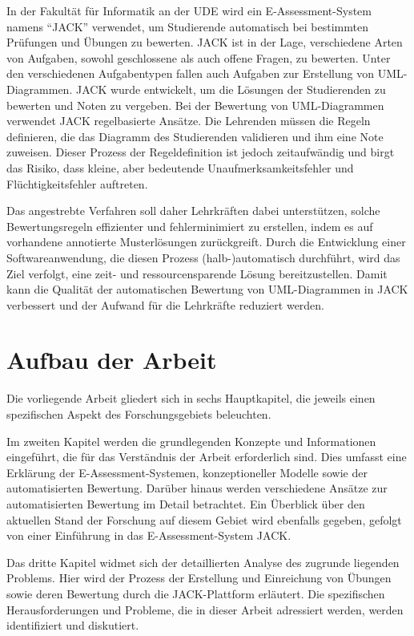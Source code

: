 In der Fakultät für Informatik an der \ac{UDE} wird ein E-Assessment-System namens ``\gls{JACK}'' \cite{jack}  verwendet, um Studierende automatisch bei bestimmten Prüfungen und Übungen zu bewerten. \gls{JACK} ist in der Lage, verschiedene Arten von Aufgaben, sowohl geschlossene als auch offene Fragen, zu bewerten. Unter den verschiedenen Aufgabentypen fallen auch Aufgaben zur Erstellung von \ac{UML}-Diagrammen. \gls{JACK} wurde entwickelt, um die Lösungen der Studierenden zu bewerten und Noten zu vergeben. Bei der Bewertung von \ac{UML}-Diagrammen verwendet \gls{JACK} regelbasierte Ansätze. Die Lehrenden müssen die Regeln definieren, die das Diagramm des Studierenden validieren und ihm eine Note zuweisen. Dieser Prozess der Regeldefinition ist jedoch zeitaufwändig und birgt das Risiko, dass kleine, aber bedeutende Unaufmerksamkeitsfehler und Flüchtigkeitsfehler auftreten.

Das angestrebte Verfahren soll daher Lehrkräften dabei unterstützen, solche Bewertungsregeln effizienter und fehlerminimiert zu erstellen, indem es auf vorhandene annotierte Musterlösungen zurückgreift. Durch die Entwicklung einer Softwareanwendung, die diesen Prozess (halb-)automatisch durchführt, wird das Ziel verfolgt, eine zeit- und ressourcensparende Lösung bereitzustellen. Damit kann die Qualität der automatischen Bewertung von UML-Diagrammen in \gls{JACK} verbessert und der Aufwand für die Lehrkräfte reduziert werden.

\section{Aufbau der Arbeit}

Die vorliegende Arbeit gliedert sich in sechs Hauptkapitel, die jeweils einen spezifischen Aspekt des Forschungsgebiets beleuchten.

Im zweiten Kapitel werden die grundlegenden Konzepte und Informationen eingeführt, die für das Verständnis der Arbeit erforderlich sind. Dies umfasst eine Erklärung der \gls{E-Assessment-Systemen}, konzeptioneller Modelle sowie der automatisierten Bewertung. Darüber hinaus werden verschiedene Ansätze zur automatisierten Bewertung im Detail betrachtet. Ein Überblick über den aktuellen Stand der Forschung auf diesem Gebiet wird ebenfalls gegeben, gefolgt von einer Einführung in das E-Assessment-System \gls{JACK}.

Das dritte Kapitel widmet sich der detaillierten Analyse des zugrunde liegenden Problems. Hier wird der Prozess der Erstellung und Einreichung von Übungen sowie deren Bewertung durch die \gls{JACK}-Plattform erläutert. Die spezifischen Herausforderungen und Probleme, die in dieser Arbeit adressiert werden, werden identifiziert und diskutiert.

